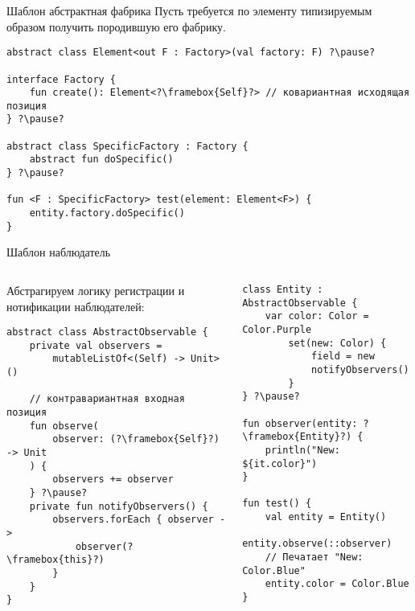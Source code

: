 \documentclass[handout,aspectratio=169,usenames,dvipsnames]{beamer}
\begin{document}
    \begin{frame}[fragile]{Шаблон абстрактная фабрика}
        Пусть требуется по элементу типизируемым образом получить породившую его фабрику.

        \begin{verbatim}
abstract class Element<out F : Factory>(val factory: F) ?\pause?

interface Factory {
    fun create(): Element<?\framebox{Self}?> // ковариантная исходящая позиция
} ?\pause?

abstract class SpecificFactory : Factory {
    abstract fun doSpecific()
} ?\pause?

fun <F : SpecificFactory> test(element: Element<F>) {
    entity.factory.doSpecific()
}
        \end{verbatim}
    \end{frame}

    \begin{frame}[fragile]{Шаблон наблюдатель}
        \begin{columns}
            \begin{column}{0.48\textwidth}
                Абстрагируем логику регистрации и нотификации наблюдателей:
                \begin{verbatim}
abstract class AbstractObservable {
    private val observers =
        mutableListOf<(Self) -> Unit>()

    // контравариантная входная позиция
    fun observe(
        observer: (?\framebox{Self}?) -> Unit
    ) {
        observers += observer
    } ?\pause?
    private fun notifyObservers() {
        observers.forEach { observer ->
            observer(?\framebox{this}?)
        }
    }
}
                \end{verbatim}
            \end{column}
            \pause
            \begin{column}{0.49\textwidth}
                \vspace{-0.5em}
                \begin{verbatim}
class Entity : AbstractObservable {
    var color: Color = Color.Purple
        set(new: Color) {
            field = new
            notifyObservers()
        }
} ?\pause?

fun observer(entity: ?\framebox{Entity}?) {
    println("New: ${it.color}")
}

fun test() {
    val entity = Entity()
    entity.observe(::observer)
    // Печатает "New: Color.Blue"
    entity.color = Color.Blue
}
                \end{verbatim}
            \end{column}
        \end{columns}
    \end{frame}
\end{document}
